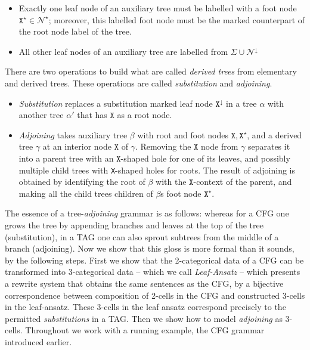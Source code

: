 \begin{fullwidth}
\begin{defn}
\begin{itemize}
{\begin{itemize}
{\begin{itemize}
			\item{Exactly one leaf node of an auxiliary tree must be labelled with a foot node $\texttt{X}^{\star} \in \mathcal{N}^{\star}$; moreover, this labelled foot node must be the marked counterpart of the root node label of the tree.}
			\item{All other leaf nodes of an auxiliary tree are labelled from $\Sigma \cup \mathcal{N}^{\downarrow}$}
		\end{itemize}
		}
	\end{itemize}
	}
\end{itemize}
There are two operations to build what are called \emph{derived trees} from elementary and derived trees. These operations are called \emph{substitution} and \emph{adjoining}.
\begin{itemize}
	\item{\emph{Substitution} replaces a substitution marked leaf node $\texttt{X}^\downarrow$ in a tree $\alpha$ with another tree $\alpha'$ that has $\texttt{X}$ as a root node.}
	\item{\emph{Adjoining} takes auxiliary tree $\beta$ with root and foot nodes $\texttt{X},\texttt{X}^\star$, and a derived tree $\gamma$ at an interior node $\texttt{X}$ of $\gamma$. Removing the $\texttt{X}$ node from $\gamma$ separates it into a parent tree with an $\texttt{X}$-shaped hole for one of its leaves, and possibly multiple child trees with \texttt{X}-shaped holes for roots. The result of adjoining is obtained by identifying the root of $\beta$ with the $\texttt{X}$-context of the parent, and making all the child trees children of $\beta$s foot node $\texttt{X}^\star$.}
\end{itemize}
\end{defn}

The essence of a tree-\emph{adjoining} grammar is as follows: whereas for a CFG one grows the tree by appending branches and leaves at the top of the tree (substitution), in a TAG one can also sprout subtrees from the middle of a branch (adjoining). Now we show that this gloss is more formal than it sounds, by the following steps. First we show that the 2-categorical data of a CFG can be transformed into 3-categorical data -- which we call \emph{Leaf-Ansatz} -- which presents a rewrite system that obtains the same sentences as the CFG, by a bijective correspondence between composition of 2-cells in the CFG and constructed 3-cells in the leaf-ansatz. These 3-cells in the leaf ansatz correspond precisely to the permitted \emph{substitutions} in a TAG. Then we show how to model \emph{adjoining} as 3-cells. Throughout we work with a running example, the CFG grammar introduced earlier.


\end{fullwidth}

